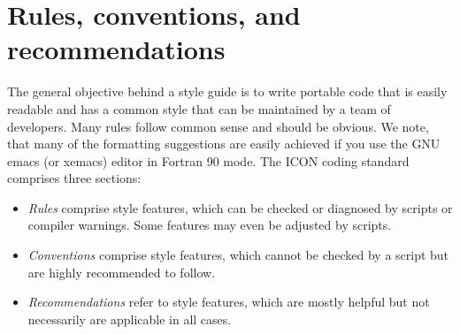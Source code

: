 \documentclass[a4paper,11pt,DIV16,BCOR1cm,titlepage]{scrartcl}
\begin{document}
%
\section{Rules, conventions, and recommendations}
%
The general objective behind a style guide is to write portable code  
that is easily readable and has a common style that can be maintained 
by a team of developers. Many rules follow common sense and should be obvious. We note,  
that many of the formatting suggestions are easily achieved if you use  
the GNU emacs (or xemacs) editor in Fortran 90 mode.  
%
The ICON coding standard comprises three sections: 
\begin{itemize}  
\item \emph{Rules} comprise style features, which can be checked or diagnosed by 
scripts or compiler warnings. Some features may even be adjusted by scripts.
\item \emph{Conventions} comprise style features, which cannot be checked by a script but are
  highly recommended to follow.
\item \emph{Recommendations} refer to style features, which are mostly helpful but not 
necessarily are applicable in all cases.
\end{itemize}  

%
\end{document}
